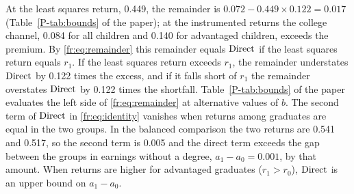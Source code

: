At the least squares return, 0.449, the remainder is
$0.072 - 0.449 \times 0.122 = 0.017$
(Table~\ref{P-tab:bounds} of the paper); at the instrumented returns
the college channel, 0.084 for all children and 0.140 for advantaged children,
exceeds the premium. By \eqref{fr:eq:remainder} this
remainder equals $\mathrm{Direct}$ if the least squares return equals $r_1$. If
the least squares return exceeds $r_1$, the remainder understates
$\mathrm{Direct}$ by 0.122 times the excess, and if it falls short of $r_1$ the
remainder overstates $\mathrm{Direct}$ by 0.122 times the shortfall.
Table~\ref{P-tab:bounds} of the paper evaluates the left side of
\eqref{fr:eq:remainder} at alternative values of $b$. The second term of
$\mathrm{Direct}$ in \eqref{fr:eq:identity} vanishes when returns among graduates
are equal in the two groups. In the balanced comparison the two returns are 0.541 and 0.517, so the
second term is 0.005 and the direct term exceeds the gap between the groups
in earnings without a degree, $a_1 - a_0 = 0.001$, by that amount. When
returns are higher for advantaged graduates ($r_1 > r_0$), $\mathrm{Direct}$ is an
upper bound on $a_1 - a_0$.
